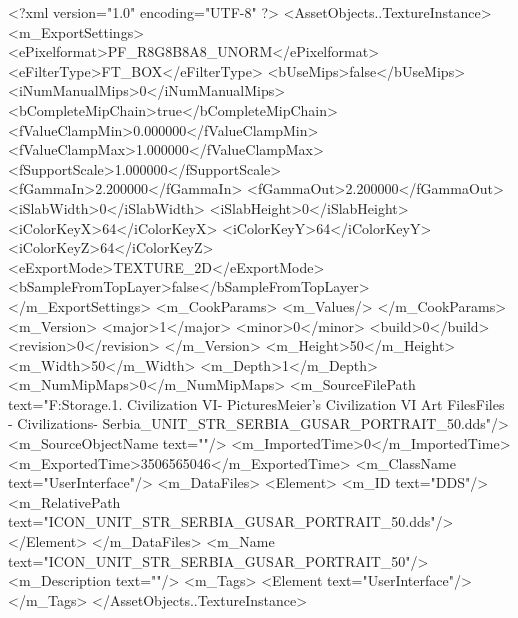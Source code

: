 <?xml version="1.0" encoding="UTF-8" ?>
<AssetObjects..TextureInstance>
	<m_ExportSettings>
		<ePixelformat>PF_R8G8B8A8_UNORM</ePixelformat>
		<eFilterType>FT_BOX</eFilterType>
		<bUseMips>false</bUseMips>
		<iNumManualMips>0</iNumManualMips>
		<bCompleteMipChain>true</bCompleteMipChain>
		<fValueClampMin>0.000000</fValueClampMin>
		<fValueClampMax>1.000000</fValueClampMax>
		<fSupportScale>1.000000</fSupportScale>
		<fGammaIn>2.200000</fGammaIn>
		<fGammaOut>2.200000</fGammaOut>
		<iSlabWidth>0</iSlabWidth>
		<iSlabHeight>0</iSlabHeight>
		<iColorKeyX>64</iColorKeyX>
		<iColorKeyY>64</iColorKeyY>
		<iColorKeyZ>64</iColorKeyZ>
		<eExportMode>TEXTURE_2D</eExportMode>
		<bSampleFromTopLayer>false</bSampleFromTopLayer>
	</m_ExportSettings>
	<m_CookParams>
		<m_Values/>
	</m_CookParams>
	<m_Version>
		<major>1</major>
		<minor>0</minor>
		<build>0</build>
		<revision>0</revision>
	</m_Version>
	<m_Height>50</m_Height>
	<m_Width>50</m_Width>
	<m_Depth>1</m_Depth>
	<m_NumMipMaps>0</m_NumMipMaps>
	<m_SourceFilePath text="F:\Mod Storage\2.1. Civilization VI\Mods\Archive - Pictures\Sid Meier's Civilization VI Art Files\Art Files - Civilizations\Civilization - Serbia\ICON_UNIT_STR_SERBIA_GUSAR_PORTRAIT_50.dds"/>
	<m_SourceObjectName text=""/>
	<m_ImportedTime>0</m_ImportedTime>
	<m_ExportedTime>3506565046</m_ExportedTime>
	<m_ClassName text="UserInterface"/>
	<m_DataFiles>
		<Element>
			<m_ID text="DDS"/>
			<m_RelativePath text="ICON_UNIT_STR_SERBIA_GUSAR_PORTRAIT_50.dds"/>
		</Element>
	</m_DataFiles>
	<m_Name text="ICON_UNIT_STR_SERBIA_GUSAR_PORTRAIT_50"/>
	<m_Description text=""/>
	<m_Tags>
		<Element text="UserInterface"/>
	</m_Tags>
</AssetObjects..TextureInstance>


